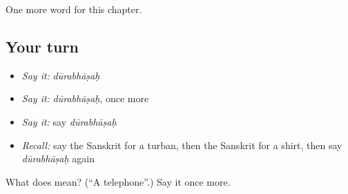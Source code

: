 \begin{grammarlens}[title={What you've built}]
One more word for this chapter.
\end{grammarlens}

\subsection*{Your turn}
\begin{itemize}
\raggedright
  \item \emph{Say it:} \emph{dūrabhāṣaḥ}
  \item \emph{Say it:} \emph{dūrabhāṣaḥ}, once more
  \item \emph{Say it:} say \emph{dūrabhāṣaḥ}
  \item \emph{Recall:} say the Sanskrit for a turban, then the Sanskrit for a shirt, then say \emph{dūrabhāṣaḥ} again
\end{itemize}

\begin{tcolorbox}[breakable,colback=teal!4,colframe=teal!35!black,title={Before you move on}]
What does  mean? (\textquotedblleft{}A telephone\textquotedblright{}.) Say it once more.
\end{tcolorbox}
